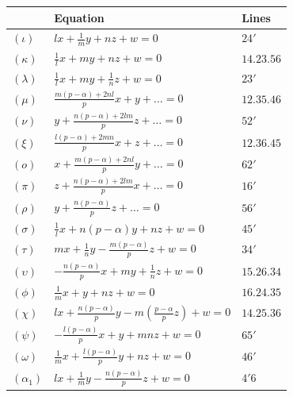 \documentclass[11pt,a4paper]{article}
\theoremstyle{definition}
\begin{document}
\begin{table}[h]
\centering
\begin{tabular}{@{}lll@{}}
\toprule
& Equation & Lines \\
\midrule
$(\iota)$ & $lx + \frac{1}{m}y + nz + w = 0$ & $24'$ \\
$(\kappa)$ & $\frac{1}{l}x + my + nz + w = 0$ & $14.23.56$ \\
$(\lambda)$ & $\frac{1}{l}x + my + \frac{1}{n}z + w = 0$ & $23'$ \\
$(\mu)$ & $\frac{m(p-\alpha) + 2nl}{p}x + y + \ldots = 0$ & $12.35.46$ \\
$(\nu)$ & $y + \frac{n(p-\alpha) + 2lm}{p}z + \ldots = 0$ & $52'$ \\
$(\xi)$ & $\frac{l(p-\alpha) + 2mn}{p}x + z + \ldots = 0$ & $12.36.45$ \\
$(o)$ & $x + \frac{m(p-\alpha) + 2nl}{p}y + \ldots = 0$ & $62'$ \\
$(\pi)$ & $z + \frac{n(p-\alpha) + 2lm}{p}x + \ldots = 0$ & $16'$ \\
$(\rho)$ & $y + \frac{n(p-\alpha)}{p}z + \ldots = 0$ & $56'$ \\
$(\sigma)$ & $\frac{1}{l}x + n(p-\alpha)y + nz + w = 0$ & $45'$ \\
$(\tau)$ & $mx + \frac{1}{n}y - \frac{m(p-\alpha)}{p}z + w = 0$ & $34'$ \\
$(\upsilon)$ & $-\frac{n(p-\alpha)}{p}x + my + \frac{1}{n}z + w = 0$ & $15.26.34$ \\
$(\phi)$ & $\frac{1}{m}x + y + nz + w = 0$ & $16.24.35$ \\
$(\chi)$ & $lx + \frac{n(p-\alpha)}{p}y - m(\frac{p-\alpha}{p}z) + w = 0$ & $14.25.36$ \\
$(\psi)$ & $-\frac{l(p-\alpha)}{p}x + y + mnz + w = 0$ & $65'$ \\
$(\omega)$ & $\frac{1}{m}x + \frac{l(p-\alpha)}{p}y + nz + w = 0$ & $46'$ \\
$(\alpha_{1})$ & $lx + \frac{1}{m}y - \frac{n(p-\alpha)}{p}z + w = 0$ & $4'6$ \\
\bottomrule
\end{tabular}
\end{table}

\newpage

\setcounter{page}{449}
\end{document}
